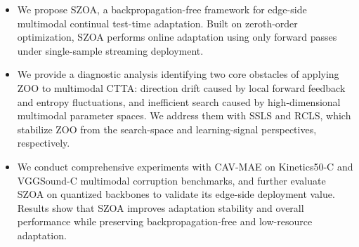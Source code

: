 \begin{itemize}
    \item We propose SZOA, a backpropagation-free framework for edge-side multimodal continual test-time adaptation. Built on zeroth-order optimization, SZOA performs online adaptation using only forward passes under single-sample streaming deployment.
    \item We provide a diagnostic analysis identifying two core obstacles of applying ZOO to multimodal CTTA: direction drift caused by local forward feedback and entropy fluctuations, and inefficient search caused by high-dimensional multimodal parameter spaces. We address them with SSLS and RCLS, which stabilize ZOO from the search-space and learning-signal perspectives, respectively.
    \item We conduct comprehensive experiments with CAV-MAE on Kinetics50-C and VGGSound-C multimodal corruption benchmarks, and further evaluate SZOA on quantized backbones to validate its edge-side deployment value. Results show that SZOA improves adaptation stability and overall performance while preserving backpropagation-free and low-resource adaptation.
\end{itemize}
